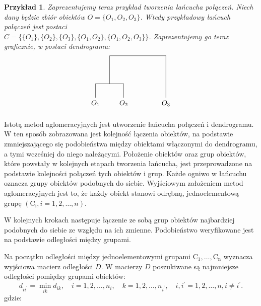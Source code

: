 \documentclass[12pt,a4paper]{report}
\newtheorem{example}{Przykład}
\begin{document}
\begin{example}
Zaprezentujemy teraz przykład tworzenia łańcucha połączeń. Niech dany będzie zbiór obiektów $O=\{O_1, O_2, O_3\}$. Wtedy przykładowy łańcuch połączeń jest postaci \\
$C=\{ \{O_1\}, \{O_2\}, \{O_3\}, \{O_1, O_2\}, \{O_1, O_2, O_3\} \}$. Zaprezentujemy go teraz graficznie, w postaci dendrogramu: 
$$
\begin{tikzpicture}[scale=.7]
  \node (1) at (0.0,-0.40) {$O_{1}$};
  \node (2) at (2.0,-0.40) {$O_{2}$};
  \node (3) at (5,-0.40) {$O_{3}$}; 
   \draw (0,0)--(0,1); 
   \draw (0,1)--(2,1);
   \draw (2,0)--(2,1);
   \draw (1,1)--(1,3);
   \draw (1,3)--(5,3);
   \draw (5,0)--(5,3);
\end{tikzpicture}
$$ 
\end{example}



Istotą metod aglomeracyjnych jest utworzenie łańcucha połączeń i dendrogramu. W ten sposób zobrazowana jest kolejność łączenia obiektów, na podstawie zmniejszającego się podobieństwa między obiektami włączonymi do dendrogramu, a tymi wcześniej do niego należącymi. Położenie obiektów oraz grup obiektów, które powstały w kolejnych etapach tworzenia łańcucha, jest przeprowadzone na podstawie kolejności połączeń tych obiektów i grup. Każde ogniwo w łańcuchu oznacza grupy obiektów podobnych do siebie. 
Wyjściowym założeniem metod aglomeracyjnych jest to, że każdy obiekt stanowi odrębną, jednoelementową grupę $(\mathrm{C_{i}}, i=1,2,\dots,n)$.

W kolejnych krokach następuje łączenie ze sobą grup obiektów najbardziej podobnych do siebie ze względu na ich zmienne. Podobieństwo weryfikowane jest na podstawie odległości między grupami.  %

Na początku odległości między jednoelementowymi grupami $\mathrm{C_{1}},\dots,\mathrm{C_{n}}$ wyznacza wyjściowa macierz odległości $D$. W macierzy $D$ poszukiwane są najmniejsze odległości pomiędzy grupami obiektów:
$$
d_{ii^{'}}= \min\limits_{ik} {d_{ik}}, \quad i=1,2,\dots,n_{i}, \quad k=1,2,\dots,n_{i^{'}}, \quad i,i^{'}=1,2,\dots,n, i\neq i^{'}.
$$
gdzie:
\end{document}
